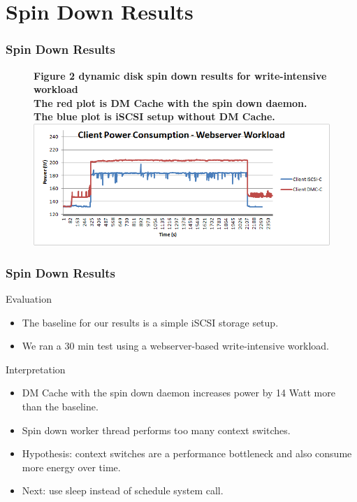 \documentclass{beamer}
\begin{document}
\section{Spin Down Results}
%
\begin{frame}
    \frametitle{Spin Down Results}
    \begin{figure}
	\raggedright \bf Figure 2 \rm dynamic disk spin down results for write-intensive workload \\
	The red plot is DM Cache with the spin down daemon. The blue plot
	is iSCSI setup without DM Cache. \\
	\vspace{15pt}
	\centering \includegraphics[scale=.45]{image.png}
	\label{fig:results}
    \end{figure}
\end{frame}
\begin{frame}
    \frametitle{Spin Down Results}
    \begin{block}{Evaluation}
	\begin{itemize}
	    \item The baseline for our results is a simple iSCSI storage setup.
	    \item We ran a 30 min test using a webserver-based write-intensive workload.
	\end{itemize}
    \end{block}
    \vspace{5pt}
    \begin{block}{Interpretation}
	\begin{itemize}
	    \item DM Cache with the spin down daemon increases power
		by 14 Watt more than the baseline.
	    \item Spin down worker thread performs too many context switches.
	    \item Hypothesis: context switches are a performance
	    	bottleneck and also consume more energy over time.
	    \item Next: use sleep instead of schedule system call.
	\end{itemize}
    \end{block}
\end{frame}
\end{document}
